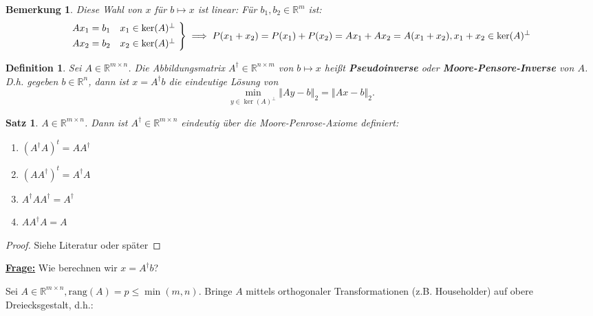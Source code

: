 \documentclass{book}
\newtheorem{theorem}[algorithm]{Satz}
\newtheorem{definition}[algorithm]{Definition}
\newtheorem{remark}[algorithm]{Bemerkung}
\def\R{\mathbb{R}}
\def\rang{\text{rang}}
\begin{document}
            \begin{remark}\label{b2.21}
                Diese Wahl von $x$ für $b\mapsto x$ ist linear: Für $b_1,b_2\in\R^m$ ist:
                \[
                \begin{rcases*}
                Ax_1 = b_1 & $x_1 \in\text{ker}(A)^\perp$ \\
                Ax_2 = b_2 & $x_2 \in\text{ker}(A)^\perp$
                \end{rcases*} \implies P(x_1+x_2)=P(x_1)+P(x_2)=Ax_1+Ax_2=A(x_1+x_2),x_1+x_2\in \ker(A)^\perp
                \]
            \end{remark}

            \begin{definition}\label{d2.22}
                Sei $A\in\R^{m\times n}$. Die Abbildungsmatrix $A^\dagger\in\R^{n\times m}$ von $b\mapsto x$ heißt 
                \textbf{Pseudoinverse} oder \textbf{Moore-Pensore-Inverse} von $A$. D.h. gegeben $b\in\R^n$, dann ist $x=A^\dagger b$ die eindeutige Lösung von 
                \[
                    \min_{y\in\ker(A)^\perp} \left\Vert Ay-b \right\Vert_2 = \left\Vert Ax-b \right\Vert_2.    
                \]
            \end{definition}
            
            \begin{theorem}\label{s2.23}
                $A\in\R^{m\times n}$. Dann ist $A^\dagger\in\R^{m\times n}$ eindeutig über die Moore-Penrose-Axiome definiert:
                \begin{enumerate}
                    \item $(A^\dagger A)^t=AA^\dagger$
                    \item $(AA^\dagger )^t=A^\dagger A$
                    \item $A^\dagger AA^\dagger = A^\dagger$
                    \item $AA^\dagger A=A$
                \end{enumerate}
            \end{theorem}

            \begin{proof}
                Siehe Literatur oder später
            \end{proof}

            \underline{\textbf{Frage:}} Wie berechnen wir $x=A^\dagger b$?

            Sei $A\in\R^{m\times n},\rang(A)=p\leq \min(m,n)$. Bringe $A$ mittels orthogonaler Transformationen (z.B. Householder) auf 
            obere Dreiecksgestalt, d.h.:
\end{document}
